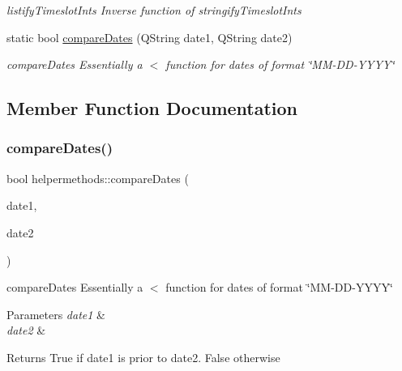 \begin{DoxyCompactItemize}
\begin{DoxyCompactList}\small\item\em listify\+Timeslot\+Ints Inverse function of stringify\+Timeslot\+Ints \end{DoxyCompactList}\item 
static bool \hyperlink{classhelpermethods_a78e0af34a4ee72796f2e1ea3504bf678}{compare\+Dates} (Q\+String date1, Q\+String date2)
\begin{DoxyCompactList}\small\item\em compare\+Dates Essentially a $<$ function for dates of format \char`\"{}\+M\+M-\/\+D\+D-\/\+Y\+Y\+Y\+Y\char`\"{} \end{DoxyCompactList}\end{DoxyCompactItemize}


\subsection{Member Function Documentation}
\mbox{\label{classhelpermethods_a78e0af34a4ee72796f2e1ea3504bf678}} 
\subsubsection{\texorpdfstring{compare\+Dates()}{compareDates()}}
{\footnotesize\ttfamily bool helpermethods\+::compare\+Dates (\begin{DoxyParamCaption}\item[{Q\+String}]{date1,  }\item[{Q\+String}]{date2 }\end{DoxyParamCaption})\hspace{0.3cm}{\ttfamily [static]}}



compare\+Dates Essentially a $<$ function for dates of format \char`\"{}\+M\+M-\/\+D\+D-\/\+Y\+Y\+Y\+Y\char`\"{} 


\begin{DoxyParams}{Parameters}
{\em date1} & \\
\hline
{\em date2} & \\
\hline
\end{DoxyParams}
\begin{DoxyReturn}{Returns}
True if date1 is prior to date2. False otherwise 
\end{DoxyReturn}
\mbox{\label{classhelpermethods_a8eb0fa4dbe1ac5465ba69976ed93b7e9}} 

